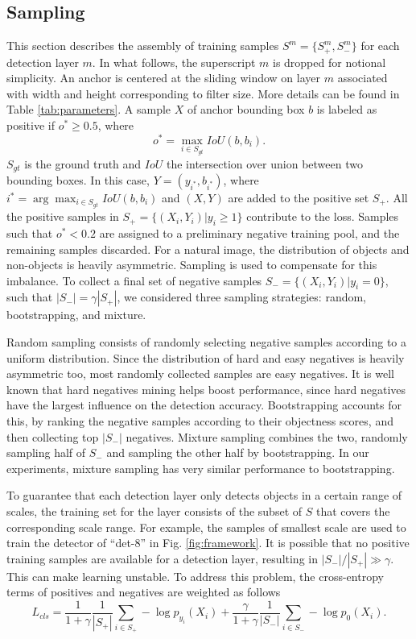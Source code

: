 \documentclass[runningheads]{llncs}
\begin{document}
\subsection{Sampling}
This section describes the assembly of training samples
$S^m=\{S_+^m,S_-^m\}$ for each detection layer $m$. In what follows,
the superscript $m$ is dropped for notional simplicity. An anchor is centered at the sliding window on layer $m$ associated with width and height corresponding to filter size. More details can be found in Table \ref{tab:parameters}. A sample $X$ of anchor bounding box $b$ is labeled as positive if $o^*\geq{0.5}$, where
\begin{equation}
o^*=\max_{i\in{S_{gt}}}IoU(b,b_i).
\end{equation}
$S_{gt}$ is the ground truth and $IoU$ the intersection over union between
two bounding boxes. In this case, $Y=(y_{i^*},b_{i^*})$, where $i^*=\arg\max_{i\in{S_{gt}}}IoU(b,b_i)$ and $(X, Y)$ are added to
the positive set $S_+$. All the positive samples in $S_+=\{(X_i,Y_i)|y_i\geq{1}\}$ contribute to the loss. Samples such that $o^*<0.2$ are assigned to a preliminary negative training pool, and the remaining samples discarded. For a natural image, the distribution of objects and non-objects is heavily asymmetric. Sampling is used to compensate for this imbalance. To collect a final set of negative samples $S_-=\{(X_i,Y_i)|y_i=0\}$, such that $|S_-|=\gamma|S_+|$, we considered three sampling strategies: random, bootstrapping, and mixture.

Random sampling consists of randomly selecting negative samples according to a uniform distribution. Since the distribution of hard and easy negatives is heavily asymmetric too, most randomly collected samples are easy negatives.
It is well known that hard negatives mining helps boost performance, since hard negatives have the largest influence on the detection accuracy. Bootstrapping accounts for this, by ranking the negative samples according to their objectness scores, and then collecting top $|S_-|$ negatives.  Mixture sampling combines the two, randomly sampling half of $S_-$
and sampling the other half by bootstrapping. In our experiments, mixture sampling has very similar performance to bootstrapping.

To guarantee that each detection layer only detects objects in a
certain range of scales, the training set for the layer
consists of the subset of $S$ that covers the corresponding scale range.
For example, the
samples of smallest scale are used to train the detector of ``det-8''
in Fig. \ref{fig:framework}. It is possible that no positive training samples
are available for a detection layer, resulting in $|S_-|/|S_+|\gg\gamma$.
This can make learning unstable. To address this problem,
the cross-entropy terms of positives and negatives are weighted as follows
\begin{equation}
L_{cls}=\frac{1}{1+\gamma}\frac{1}{|S_+|}\sum_{i\in{S_+}}-\log p_{y_i}(X_i)
+\frac{\gamma}{1+\gamma}\frac{1}{|S_-|}\sum_{i\in{S_-}}-\log p_{0}(X_i).
\end{equation}
\end{document}
